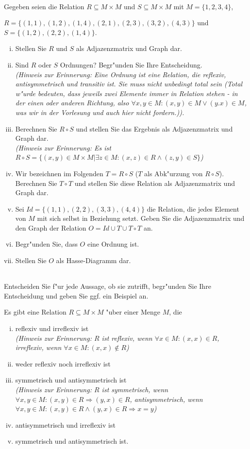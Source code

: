 \\
Gegeben seien die Relation $R\subseteq M\times M$ und $S\subseteq M\times M$ mit $M=\{1,2,3,4\}$, 

$R=\{(1,1),(1,2),(1,4),(2,1),(2,3),(3,2),(4,3)\}$ und $S=\{(1,2),(2,2),(1,4)\}$.
\begin{enumerate}[(i)]
\item Stellen Sie $R$ und $S$ als Adjazenzmatrix und Graph dar.
\item Sind $R$ oder $S$ Ordnungen? Begr"unden Sie Ihre Entscheidung.\\
\textit{(Hinweis zur Erinnerung: Eine Ordnung ist eine Relation, die reflexiv, antisymmetrisch und transitiv ist. Sie muss nicht unbedingt total sein (Total w"urde bedeuten, dass jeweils zwei Elemente immer in Relation stehen - in der einen oder anderen Richtung, also $\forall x,y\in M:(x,y)\in M\vee (y.x)\in M$, was wir in der Vorlesung und auch hier nicht fordern.)).}
\item Berechnen Sie $R\circ S$ und stellen Sie das Ergebnis als Adjazenzmatrix und Graph dar.\\
\textit{(Hinweis zur Erinnerung: Es ist $R\circ S=\{(x,y)\in M\times M|\exists z\in M: (x,z)\in R\wedge (z,y)\in S\}$)}
\item Wir bezeichnen im Folgenden $T=R\circ S$ ($T$ als Abk"urzung von $R\circ S$). Berechnen Sie $T\circ T$ und stellen Sie diese Relation als Adjazenzmatrix und Graph dar.
\item Sei $Id=\{(1,1),(2,2),(3,3),(4,4)\}$ die Relation, die jedes Element von $M$ mit sich selbst in Beziehung setzt. Geben Sie die Adjazenzmatrix und den Graph der Relation $O=Id\cup T\cup T\circ T$ an.
\item Begr"unden Sie, dass $O$ eine Ordnung ist.
\item Stellen Sie $O$ als Hasse-Diagramm dar.

\end{enumerate}

\\
Entscheiden Sie f"ur jede Aussage, ob sie zutrifft, begr"unden Sie Ihre Entscheidung und geben Sie ggf. ein Beispiel an.

Es gibt eine Relation $R\subseteq M\times M$ "uber einer Menge $M$, die 
\begin{enumerate}[(i)]
\item reflexiv und irreflexiv ist\\
\textit{(Hinweis zur Erinnerung: $R$ ist reflexiv, wenn $\forall x\in M:(x,x)\in R$, irreflexiv, wenn $\forall x\in M:(x,x)\notin R$)}
\item weder reflexiv noch irreflexiv ist
\item symmetrisch und antisymmetrisch ist\\
\textit{(Hinweis zur Erinnerung: $R$ ist symmetrisch, wenn $\forall x,y\in M:(x,y)\in R\Rightarrow (y,x)\in R$, antisymmetrisch, wenn $\forall x,y\in M:(x,y)\in R\wedge (y,x)\in R\Rightarrow x=y$)}
\item antisymmetrisch und irreflexiv ist
\item symmetrisch und antisymmetrisch ist.
\end{enumerate}

